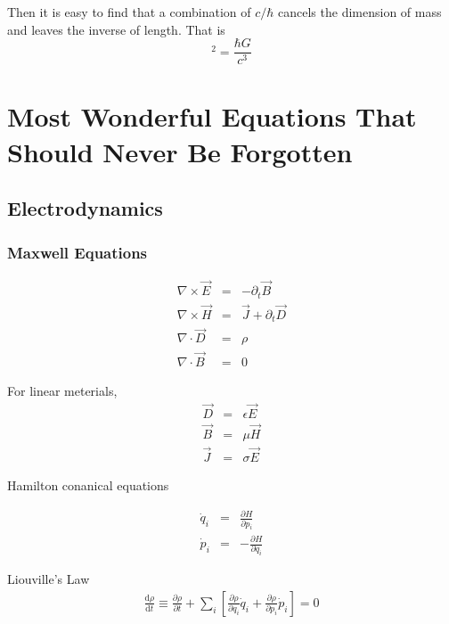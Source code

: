 \documentclass[12pt,a4paper]{book}
\begin{document}
Then it is easy to find that a combination of $c/\hbar$ cancels the dimension of mass and leaves the inverse of length. That is
\begin{equation}
[Length]^2 = \frac{\hbar G}{c^3}
\end{equation}



\section{Most Wonderful Equations That Should Never Be Forgotten}

\subsection{Electrodynamics}

\subsubsection{Maxwell Equations}
\begin{eqnarray}
\nabla\times\vec E&=&-\partial_t \vec B \\
\nabla\times\vec H&=&\vec J+\partial_t \vec D \\
\nabla\cdot \vec D&=&\rho \\
\nabla\cdot \vec B&=&0
\end{eqnarray}

For linear meterials, \begin{eqnarray}
\vec D&=&\epsilon \vec E \\
\vec B&=&\mu \vec H \\
\vec J&=& \sigma \vec E
\end{eqnarray}


Hamilton conanical equations

\begin{eqnarray}
\dot q_i &=& \frac{\partial H}{\partial p_i}  \\
\dot p_i &=& - \frac{\partial H}{\partial q_i}
\end{eqnarray}


Liouville's Law
\begin{eqnarray}
\frac{\mathrm d \rho}{\mathrm d t}\equiv \frac{\partial \rho}{\partial t} + \sum_i \left[ \frac{\partial \rho}{\partial q_i}\dot q_i + \frac{\partial \rho}{\partial p_i}\dot p_i \right] = 0
\end{eqnarray}
\end{document}
